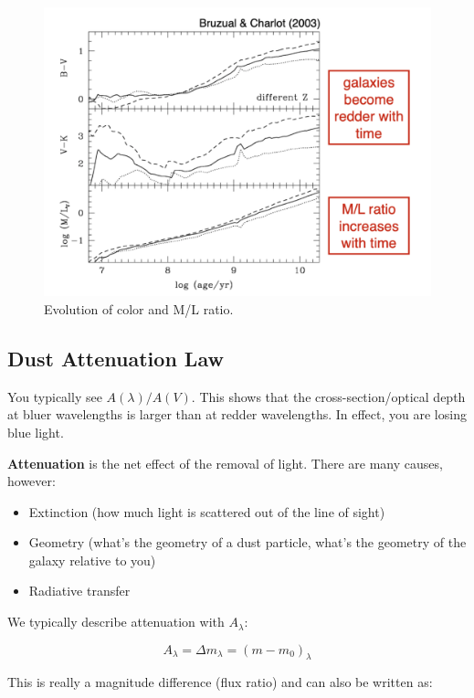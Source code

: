 \documentclass{article}
\begin{document}
\begin{figure}
    \centering
    \includegraphics{figs/Screen Shot 2021-09-17 at 9.21.29 AM.png}
    \caption{Evolution of color and M/L ratio.}
    \label{fig:imf}
\end{figure}

\subsection{Dust Attenuation Law}

You typically see $A(\lambda)/A(V)$. This shows that the cross-section/optical depth at bluer wavelengths is larger than at redder wavelengths. In effect, you are losing blue light. 

\textbf{Attenuation} is the net effect of the removal of light. There are many causes, however:
\begin{itemize}
    \item Extinction (how much light is scattered out of the line of sight)
    \item Geometry (what's the geometry of a dust particle, what's the geometry of the galaxy relative to you)
    \item Radiative transfer 
\end{itemize}

We typically describe attenuation with $A_\lambda$:

\begin{equation}
    A_\lambda = \Delta m_\lambda = \left(m - m_0\right)_\lambda
\end{equation}

This is really a magnitude difference (flux ratio) and can also be written as:
\end{document}
